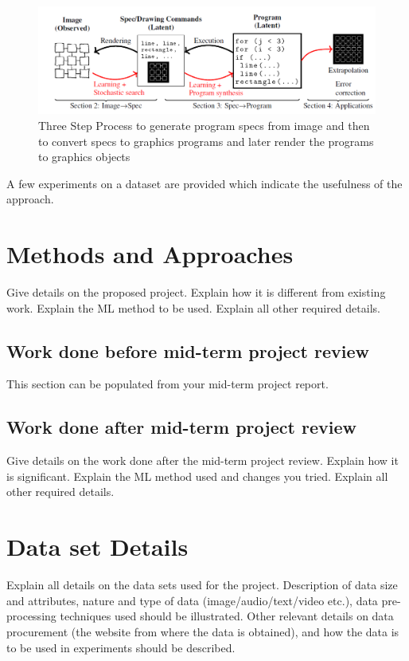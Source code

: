 \documentclass[twoside,english]{article}
\begin{document}
\begin{figure}[!h]
	\centering
	\includegraphics[scale=0.8]{threestepprocess}
	\caption{Three Step Process to generate program specs from image and then to convert specs to graphics programs and later render the programs to graphics objects}\label{threestepprocimg}
\end{figure}


  
 A few experiments on a dataset are provided which indicate the usefulness of the approach.


\section{Methods and Approaches} \label{sec:our_proj}

Give details on the proposed project. Explain how it is different from existing work. Explain the ML method to be used. Explain all other required details.

\subsection{Work done before mid-term project review} 
This section can be populated from your mid-term project report. 

\subsection{Work done after mid-term project review} 

Give details on the work done after the mid-term project review. Explain how it is significant. Explain the ML method used and changes you tried. Explain all other required details.

\section{Data set Details} \label{sec:data}

Explain all details  on the data sets used for the project. Description of data size and attributes, nature and type of data (image/audio/text/video etc.), data pre-processing techniques used should be illustrated. Other relevant details on data procurement (the website from where the data is obtained), and how the data is to be used in experiments should be described. 
\end{document}
